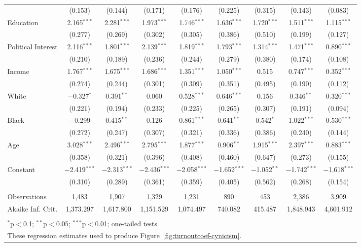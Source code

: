 \documentclass[12pt]{article}
\begin{document}
\begin{appendices}
\begin{refsection}
\begin{table}[!htbp]
\begin{adjustbox}{width=\textwidth,center}
\begin{tabular}{@{\extracolsep{5pt}}lcccccccc}
  & (0.153) & (0.144) & (0.171) & (0.176) & (0.225) & (0.315) & (0.143) & (0.083) \\ 
 Education & 2.165$^{***}$ & 2.281$^{***}$ & 1.973$^{***}$ & 1.746$^{***}$ & 1.636$^{***}$ & 1.720$^{***}$ & 1.511$^{***}$ & 1.115$^{***}$ \\ 
  & (0.277) & (0.269) & (0.302) & (0.305) & (0.386) & (0.510) & (0.199) & (0.127) \\ 
 Political Interest & 2.116$^{***}$ & 1.801$^{***}$ & 2.139$^{***}$ & 1.819$^{***}$ & 1.793$^{***}$ & 1.314$^{***}$ & 1.471$^{***}$ & 0.890$^{***}$ \\ 
  & (0.210) & (0.189) & (0.236) & (0.244) & (0.279) & (0.380) & (0.174) & (0.108) \\ 
 Income & 1.767$^{***}$ & 1.675$^{***}$ & 1.686$^{***}$ & 1.351$^{***}$ & 1.050$^{***}$ & 0.515 & 0.747$^{***}$ & 0.352$^{***}$ \\ 
  & (0.274) & (0.244) & (0.301) & (0.309) & (0.351) & (0.495) & (0.190) & (0.112) \\ 
 White & $-$0.327$^{*}$ & 0.391$^{**}$ & 0.060 & 0.528$^{***}$ & 0.646$^{***}$ & 0.156 & 0.346$^{**}$ & 0.320$^{***}$ \\ 
  & (0.221) & (0.194) & (0.233) & (0.225) & (0.265) & (0.307) & (0.191) & (0.094) \\ 
 Black & $-$0.299 & 0.415$^{**}$ & 0.126 & 0.861$^{***}$ & 0.641$^{**}$ & 0.542$^{*}$ & 1.022$^{***}$ & 0.530$^{***}$ \\ 
  & (0.272) & (0.247) & (0.307) & (0.321) & (0.336) & (0.386) & (0.240) & (0.144) \\ 
 Age & 3.028$^{***}$ & 2.496$^{***}$ & 2.795$^{***}$ & 1.877$^{***}$ & 0.906$^{**}$ & 1.915$^{***}$ & 2.397$^{***}$ & 0.883$^{***}$ \\ 
  & (0.358) & (0.321) & (0.396) & (0.408) & (0.460) & (0.647) & (0.273) & (0.155) \\ 
 Constant & $-$2.419$^{***}$ & $-$2.313$^{***}$ & $-$2.436$^{***}$ & $-$2.058$^{***}$ & $-$1.652$^{***}$ & $-$1.052$^{**}$ & $-$1.742$^{***}$ & $-$1.618$^{***}$ \\ 
  & (0.310) & (0.289) & (0.361) & (0.359) & (0.405) & (0.562) & (0.268) & (0.154) \\ 
\hline \\[-1.8ex] 
Observations & 1,483 & 1,907 & 1,329 & 1,231 & 890 & 453 & 2,386 & 3,909 \\ 
Akaike Inf. Crit. & 1,373.297 & 1,617.800 & 1,151.529 & 1,074.497 & 740.082 & 415.487 & 1,848.943 & 4,601.912 \\ 
	\hline 
	\hline \\[-1.8ex] 
	\multicolumn{9}{l}{\footnotesize $^{*}$p$<$0.1; $^{**}$p$<$0.05; $^{***}$p$<$0.01; one-tailed tests} \\ 
	\multicolumn{9}{l}{\footnotesize These regression estimates used to produce Figure~\ref{fig:turnoutcoef-cynicism}.}
	\end{tabular} 
	\end{adjustbox}
\end{table} 
\clearpage



\end{refsection}
\end{appendices}
\end{document}

